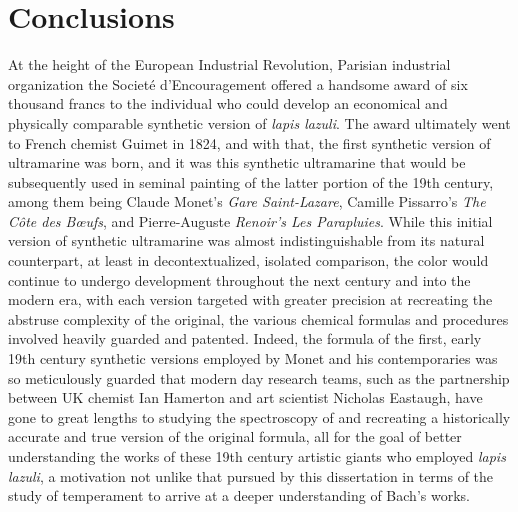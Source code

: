     
    
    

    \hypertarget{Conclusions}{\chapter{Conclusions}\label{Conclusions}}
    At the height of the European Industrial Revolution, Parisian industrial
organization the Societé d'Encouragement offered a handsome award of six
thousand francs to the individual who could develop an economical and
physically comparable synthetic version of \emph{lapis lazuli}. The
award ultimately went to French chemist Guimet in 1824, and with that,
the first synthetic version of ultramarine was born, and it was this
synthetic ultramarine that would be subsequently used in seminal
painting of the latter portion of the 19th century, among them being
Claude Monet's \emph{Gare Saint-Lazare}, Camille Pissarro's \emph{The
Côte des Bœufs}, and Pierre-Auguste \emph{Renoir's Les Parapluies}.
While this initial version of synthetic ultramarine was almost
indistinguishable from its natural counterpart, at least in
decontextualized, isolated comparison, the color would continue to
undergo development throughout the next century and into the modern era,
with each version targeted with greater precision at recreating the
abstruse complexity of the original, the various chemical formulas and
procedures involved heavily guarded and patented. Indeed, the formula of
the first, early 19th century synthetic versions employed by Monet and
his contemporaries was so meticulously guarded that modern day research
teams, such as the partnership between UK chemist Ian Hamerton and art
scientist Nicholas Eastaugh, have gone to great lengths to studying the
spectroscopy of and recreating a historically accurate and true version
of the original formula, all for the goal of better understanding the
works of these 19th century artistic giants who employed \emph{lapis
lazuli}, a motivation not unlike that pursued by this dissertation in
terms of the study of temperament to arrive at a deeper understanding of
Bach's works.

